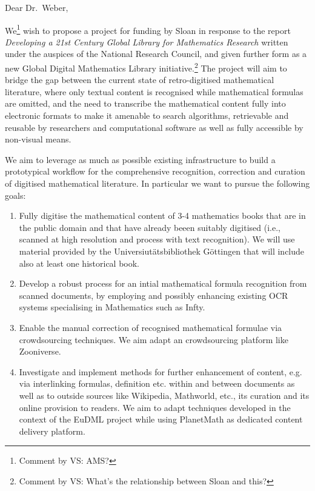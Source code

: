 \documentclass{article}
\def\comment#1#2{\typeout{Comment!}\footnote{Comment by #1: #2}}
\begin{document}

Dear Dr.~Weber,

We\comment{VS}{AMS?} wish to propose a project for funding by Sloan in response
to the report \emph{Developing a 21st Century Global Library for Mathematics
  Research} written under the auspices of the National Research Council, and
given further form as a new Global Digital Mathematics Library
initiative.\comment{VS}{What's the relationship between Sloan and this?} The
project will aim to bridge the gap between the current state of retro-digitised
mathematical literature, where only textual content is recognised while
mathematical formulas are omitted, and the need to transcribe the mathematical
content fully into electronic formats to make it amenable to search algorithms,
retrievable and reusable by researchers and computational software as well as
fully accessible by non-visual means.

We aim to leverage as much as possible existing infrastructure to build a
prototypical workflow for the comprehensive recognition, correction and curation
of digitised mathematical literature. In particular we want to pursue the
following goals:
\begin{enumerate}
\def\labelenumi{\alph{enumi})}
\item Fully digitise the mathematical content of 3-4 mathematics books that are
  in the public domain and that have already beeen suitably digitised (i.e.,
  scanned at high resolution and process with text recognition). We will use
  material provided by the Universiut{\"a}tsbibliothek G{\"o}ttingen that will
  include also at least one historical book.
\item Develop a robust process for an intial mathematical formula recognition
  from scanned documents, by employing and possibly enhancing existing OCR
  systems specialising in Mathematics such as Infty.
\item Enable the manual correction of recognised mathematical formulae via
  crowdsourcing techniques. We aim adapt an crowdsourcing platform like
  Zooniverse.
\item Investigate and implement methods for further enhancement of content,
  e.g. via interlinking formulas, definition etc. within and between documents
  as well as to outside sources like Wikipedia, Mathworld, etc., its curation
  and its online provision to readers. We aim to adapt techniques developed in
  the context of the EuDML project while using PlanetMath as dedicated content
  delivery platform.
\end{enumerate}
\end{document}
